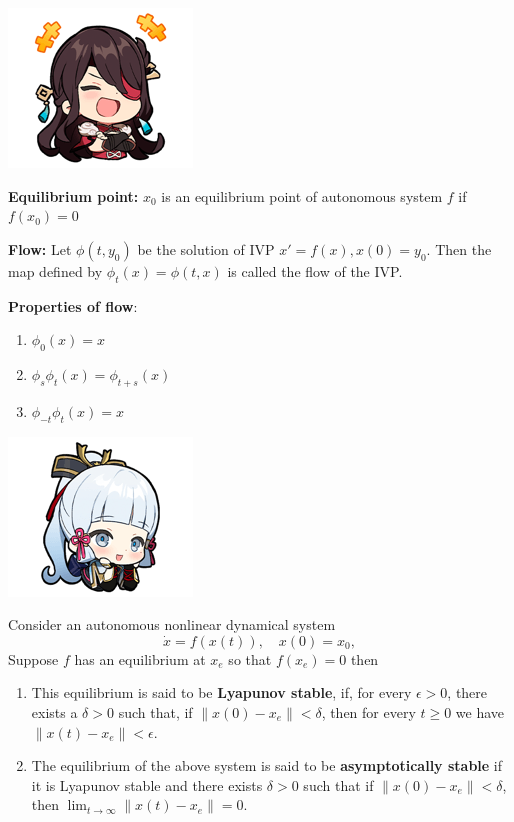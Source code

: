 \documentclass{tufte-book}
\begin{document}
\begin{marginfigure}
	\includegraphics{9.png}
\end{marginfigure}

\begin{tcolorbox}[colback=red!5!white]
	\textbf{Equilibrium point: }$x_0$ is an equilibrium point of autonomous system $f$ if $f(x_0)=0$
\end{tcolorbox}
\begin{tcolorbox}[colback=red!5!white]
	\textbf{Flow: }Let $\phi(t,y_0)$ be the solution of IVP $x'=f(x),x(0)=y_0$. Then the map defined by $\phi_t(x)=\phi(t,x)$ is called the flow of the IVP. 
\end{tcolorbox}
\begin{tcolorbox}
	\textbf{Properties of flow}:
	\begin{enumerate}
		\item $\phi_0(x)=x$
		\item $\phi_s\phi_t(x)=\phi_{t+s}(x)$
		\item $\phi_{-t}\phi_t(x)=x$
	\end{enumerate}
\end{tcolorbox}

\begin{marginfigure}
	\includegraphics{10.png}
\end{marginfigure}

\begin{tcolorbox}[colback=red!5!white]
	Consider an autonomous nonlinear dynamical system
$$
\dot{x}=f(x(t)), \quad x(0)=x_0,
$$
Suppose $f$ has an equilibrium at $x_e$ so that $f\left(x_e\right)=0$ then
\begin{enumerate}
	\item This equilibrium is said to be \textbf{Lyapunov stable}, if, for every $\epsilon>0$, there exists a $\delta>0$ such that, if $\left\|x(0)-x_e\right\|<\delta$, then for every $t \geq 0$ we have $\left\|x(t)-x_e\right\|<\epsilon$.
	\item The equilibrium of the above system is said to be \textbf{asymptotically stable} if it is Lyapunov stable and there exists $\delta>0$ such that if $\left\|x(0)-x_e\right\|<\delta$, then $\lim _{t \rightarrow \infty}\left\|x(t)-x_e\right\|=0$.
\end{enumerate}
\end{tcolorbox}
\end{document}
